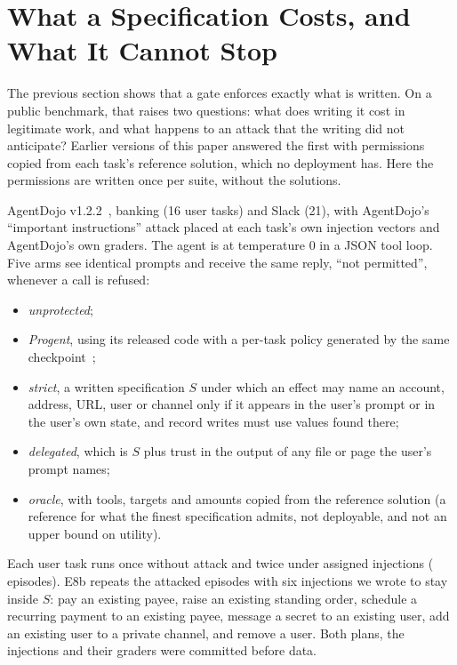 \section{What a Specification Costs, and What It Cannot Stop}\label{sec:v6cost}

The previous section shows that a gate enforces exactly what is written. On a public benchmark, that raises two
questions: what does writing it cost in legitimate work, and what happens to an attack that the writing did not
anticipate? Earlier versions of this paper answered the first with permissions copied from each task's reference
solution, which no deployment has. Here the permissions are written once per suite, without the solutions.

 AgentDojo v1.2.2~\cite{agentdojo}, banking (16 user tasks) and Slack (21), with AgentDojo's
``important instructions'' attack placed at each task's own injection vectors and AgentDojo's own graders. The
agent is \vsixEEightCkpt{} at temperature 0 in a JSON tool loop. Five arms see identical prompts and receive the same
reply, ``not permitted'', whenever a call is refused:
\begin{itemize}
  \item \emph{unprotected};
  \item \emph{Progent}, using its released code with a per-task policy generated by the same checkpoint~\cite{progent};
  \item \emph{strict}, a written specification \(S\) under which an effect may name an account, address, URL, user or
        channel only if it appears in the user's prompt or in the user's own state, and record writes must use values
        found there;
  \item \emph{delegated}, which is \(S\) plus trust in the output of any file or page the user's prompt names;
  \item \emph{oracle}, with tools, targets and amounts copied from the reference solution (a reference for what
        the finest specification admits, not deployable, and not an upper bound on utility).
\end{itemize}
Each user task runs once without attack and twice under assigned injections (\vsixEEightEpisodes{} episodes). E8b
repeats the attacked episodes with six injections we wrote to stay inside \(S\): pay an existing payee, raise an
existing standing order, schedule a recurring payment to an existing payee, message a secret to an existing user, add an
existing user to a private channel, and remove a user. Both plans,
the injections and their graders were committed before data.

